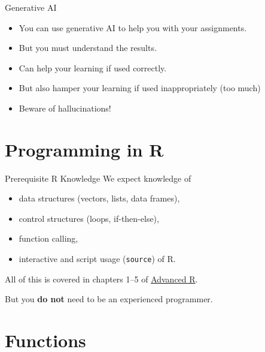 \documentclass[
  ignorenonframetext,
  aspectratio=1610,
  onlytextwidth]{beamer}
\providecommand{\tightlist}{}
\begin{document}
\begin{frame}{Generative AI}
\label{generative-ai}
\begin{itemize}[<+->]
\tightlist
\item
  You can use generative AI to help you with your assignments.
\item
  But you must understand the results.
\item
  Can help your learning if used correctly.
\item
  But also hamper your learning if used inappropriately (too much)
\item
  Beware of hallucinations!
\end{itemize}
\end{frame}

\section{Programming in R}\label{programming-in-r}

\begin{frame}[fragile]{Prerequisite R Knowledge}
\label{prerequisite-r-knowledge}
We expect knowledge of

\begin{itemize}[<+->]
\tightlist
\item
  data structures (vectors, lists, data frames),
\item
  control structures (loops, if-then-else),
\item
  function calling,
\item
  interactive and script usage (\texttt{source}) of R.
\end{itemize}

\pause

All of this is covered in chapters 1--5 of
\href{https://adv-r.hadley.nz/}{Advanced R}.

\medskip

But you \textbf{do not} need to be an experienced programmer.
\end{frame}

\section{Functions}\label{functions}
\end{document}
